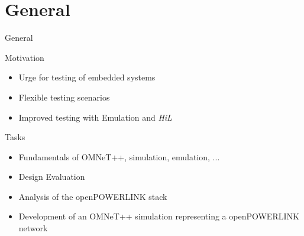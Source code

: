 \section{General}

\begin{frame}{General}
    
    \begin{block}{Motivation}
        \begin{itemize}
            \item Urge for testing of embedded systems
            \item Flexible testing scenarios
            \item Improved testing with Emulation and \emph{HiL}
        \end{itemize}
    \end{block}
    
    \begin{block}{Tasks}
        \begin{itemize}
            \item Fundamentals of OMNeT++, simulation, emulation, ...
            \item Design Evaluation
            \item Analysis of the openPOWERLINK stack
            \item Development of an OMNeT++ simulation representing a openPOWERLINK network
        \end{itemize}
    \end{block}
    
\end{frame}